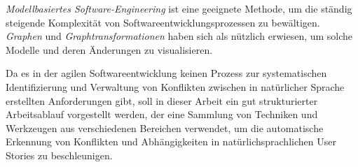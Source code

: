 \emph{Modellbasiertes Software-Engineering} ist eine geeignete Methode, um die ständig steigende Komplexität von Softwareentwicklungsprozessen zu bewältigen. \emph{Graphen} und \emph{Graphtransformationen} haben sich als nützlich erwiesen, um solche Modelle und deren Änderungen zu visualisieren.

Da es in der agilen Softwareentwicklung keinen Prozess zur systematischen Identifizierung und Verwaltung von Konflikten zwischen in natürlicher Sprache erstellten Anforderungen gibt, soll in dieser Arbeit ein gut strukturierter Arbeitsablauf vorgestellt werden, der eine Sammlung von Techniken und Werkzeugen aus verschiedenen Bereichen verwendet, um die automatische Erkennung von Konflikten und Abhängigkeiten in natürlichsprachlichen User Stories zu beschleunigen.

